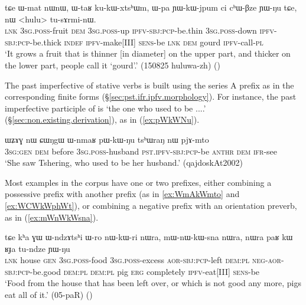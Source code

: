 \begin{exe}
\ex \label{ex:YWkWjpum2}
 \gll  tɕe ɯ-mat nɯnɯ, ɯ-taʁ ku-kɯ-xtsʰɯm, ɯ-pa ɲɯ-kɯ-jpum ci cʰɯ-βze ɲɯ-ŋu tɕe, nɯ <hulu> tu-sɤrmi-nɯ. \\
 \textsc{lnk} \textsc{3sg}.\textsc{poss}-fruit \textsc{dem} \textsc{3sg}.\textsc{poss}-up \textsc{ipfv}-\textsc{sbj}:\textsc{pcp}-be.thin \textsc{3sg}.\textsc{poss}-down \textsc{ipfv}-\textsc{sbj}:\textsc{pcp}-be.thick \textsc{indef} \textsc{ipfv}-make[III]  \textsc{sens}-be \textsc{lnk} \textsc{dem} gourd \textsc{ipfv}-call-\textsc{pl} \\
 \glt `It grows a fruit that is thinner [in diameter] on the upper part, and thicker on the lower part, people call it `gourd'.' (150825 huluwa-zh)
()
\end{exe}

The past imperfective of stative verbs is built using the series A prefix  as in the corresponding finite forms (§\ref{sec:pst.ifr.ipfv.morphology}). For instance, the past imperfective participle of  is  `the one who used to be ....' (§\ref{sec:non.existing.derivation}), as in (\ref{ex:pWkWNu}).

\begin{exe}
\ex \label{ex:pWkWNu}
 \gll  ɯʑɤɣ nɯ ɕɯŋgɯ ɯ-nmaʁ pɯ-kɯ-ŋu tsʰɯraŋ nɯ pjɤ-mto \\
 \textsc{3sg}:\textsc{gen} \textsc{dem} before \textsc{3sg}.\textsc{poss}-husband \textsc{pst}.\textsc{ipfv}-\textsc{sbj}:\textsc{pcp}-be  \textsc{anthr} \textsc{dem} \textsc{ifr}-see \\
\glt `She saw Tshering, who used to be her husband.' (qajdoskAt2002)
\end{exe}

Most examples in the corpus have one or two prefixes, either combining a possessive prefix with another prefix (as in \ref{ex:WmAkWmto} and \ref{ex:WCWkWphWt}), or combining a negative prefix with an orientation preverb, as in (\ref{ex:mWnWkWsna}).

 \begin{exe}
\ex \label{ex:mWnWkWsna}
 \gll tɕe kʰa ɣɯ ɯ-ndzɤtsʰi ɯ-ro nɯ-kɯ-ri nɯra, mɯ-nɯ-kɯ-sna nɯra, nɯra paʁ kɯ ʁɟa tu-ndze ɲɯ-ŋu \\
 \textsc{lnk} house \textsc{gen} \textsc{3sg}.\textsc{poss}-food \textsc{3sg}.\textsc{poss}-excess \textsc{aor}-\textsc{sbj}:\textsc{pcp}-left \textsc{dem}:\textsc{pl}  \textsc{neg}-\textsc{aor}-\textsc{sbj}:\textsc{pcp}-be.good \textsc{dem}:\textsc{pl} \textsc{dem}:\textsc{pl} pig \textsc{erg} completely  \textsc{ipfv}-eat[III] \textsc{sens}-be \\
 \glt  `Food from the house that has been left over, or which is not good any more, pigs eat all of it.' (05-paR)
()
\end{exe}


